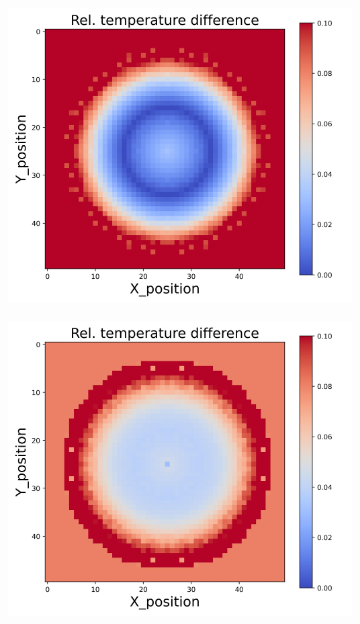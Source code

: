 \begin{figure}[h]
\begin{minipage}{\textwidth}
\begin{subfigure}{0.3\textwidth}
        \end{subfigure}
        \begin{subfigure}{0.3\textwidth}
            \centering
            \includegraphics[width=\textwidth]{figures/raw_data/23/lin_square/T_bias.jpg}
        \end{subfigure}
        \begin{subfigure}{0.3\textwidth}
            \centering
            \includegraphics[width=\textwidth]{figures/raw_data/24/lin_square/T_bias.jpg}

\end{subfigure}
\end{minipage}
\end{figure}
